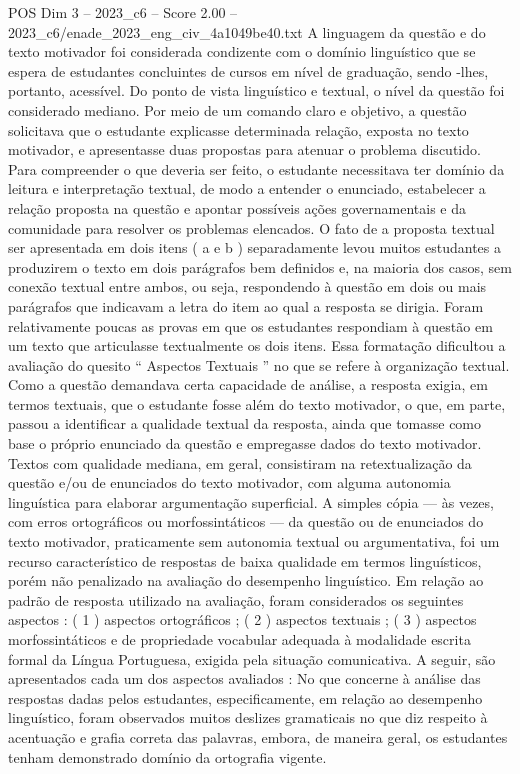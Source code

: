\begin{textsample}{POS Dim 3 – 2023\_c6 – Score 2.00 – 2023\_c6/enade\_2023\_eng\_civ\_4a1049be40.txt}
A linguagem da questão e do texto motivador foi considerada condizente com o domínio linguístico que se espera de estudantes concluintes de cursos em nível de graduação, sendo -lhes, portanto, acessível.
Do ponto de vista linguístico e textual, o nível da questão foi considerado mediano.
Por meio de um comando claro e objetivo, a questão solicitava que o estudante explicasse determinada relação, exposta no texto motivador, e apresentasse duas propostas para atenuar o problema discutido.
Para compreender o que deveria ser feito, o estudante necessitava ter domínio da leitura e interpretação textual, de modo a entender o enunciado, estabelecer a relação proposta na questão e apontar possíveis ações governamentais e da comunidade para resolver os problemas elencados.
O fato de a proposta textual ser apresentada em dois itens ( a e b ) separadamente levou muitos estudantes a produzirem o texto em dois parágrafos bem definidos e, na maioria dos casos, sem conexão textual entre ambos, ou seja, respondendo à questão em dois ou mais parágrafos que indicavam a letra do item ao qual a resposta se dirigia.
Foram relativamente poucas as provas em que os estudantes respondiam à questão em um texto que articulasse textualmente os dois itens.
Essa formatação dificultou a avaliação do quesito “ Aspectos Textuais ” no que se refere à organização textual.
Como a questão demandava certa capacidade de análise, a resposta exigia, em termos textuais, que o estudante fosse além do texto motivador, o que, em parte, passou a identificar a qualidade textual da resposta, ainda que tomasse como base o próprio enunciado da questão e empregasse dados do texto motivador.
Textos com qualidade mediana, em geral, consistiram na retextualização da questão e/ou de enunciados do texto motivador, com alguma autonomia linguística para elaborar argumentação superficial.
A simples cópia — às vezes, com erros ortográficos ou morfossintáticos — da questão ou de enunciados do texto motivador, praticamente sem autonomia textual ou argumentativa, foi um recurso característico de respostas de baixa qualidade em termos linguísticos, porém não penalizado na avaliação do desempenho linguístico.
Em relação ao padrão de resposta utilizado na avaliação, foram considerados os seguintes aspectos : ( 1 ) aspectos ortográficos ; ( 2 ) aspectos textuais ; ( 3 ) aspectos morfossintáticos e de propriedade vocabular adequada à modalidade escrita formal da Língua Portuguesa, exigida pela situação comunicativa.
A seguir, são apresentados cada um dos aspectos avaliados : No que concerne à análise das respostas dadas pelos estudantes, especificamente, em relação ao desempenho linguístico, foram observados muitos deslizes gramaticais no que diz respeito à acentuação e grafia correta das palavras, embora, de maneira geral, os estudantes tenham demonstrado domínio da ortografia vigente.

\end{textsample}
